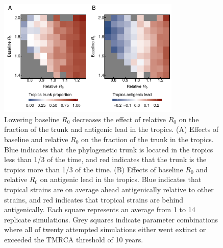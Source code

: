 \documentclass[10pt]{article}
\begin{document}
\newpage
\begin{figure}[h!]
\centerline{\includegraphics[width=3.42in]{./manuscript/figures/R0_relativeR0/R0_relativeR0.pdf}}
\caption{Lowering baseline $R_0$ decreases the effect of relative $R_0$ on the fraction of the trunk and antigenic lead in the tropics.
(A) Effects of baseline and relative $R_0$ on the fraction of the trunk in the tropics. 
Blue indicates that the phylogenetic trunk is located in the tropics less than 1/3 of the time, and red indicates that the trunk is the tropics more than 1/3 of the time. 
(B) Effects of baseline $R_0$ and relative $R_0$ on antigenic lead in the tropics. 
Blue indicates that tropical strains are on average ahead antigenically relative to other strains, and red indicates that tropical strains are behind antigenically. 
Each square represents an average from 1 to 14 replicate simulations.
Grey squares indicate parameter combinations where all of twenty attempted simulations either went extinct or exceeded the TMRCA threshold of 10 years.}
\label{fig:R0_relativeR0}
\end{figure}
\end{document}
